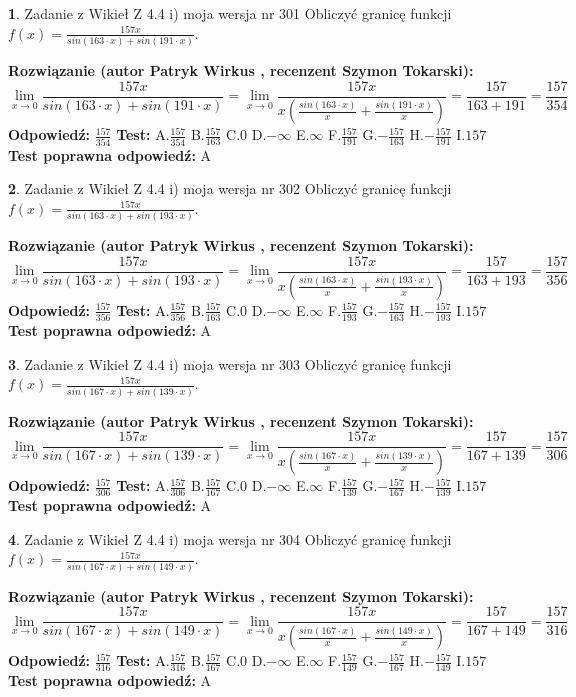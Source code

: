 \documentclass[12pt, a4paper]{article}
\theoremstyle{definition} %
\newtheorem{zad}{}
\newcommand{\zadStart}[1]{\begin{zad}#1\newline}
\newcommand{\zadStop}{\end{zad}}
\newcommand{\rozwStart}[2]{\noindent \textbf{Rozwiązanie (autor #1 , recenzent #2): }\newline}
\newcommand{\rozwStop}{\newline}
\newcommand{\odpStart}{\noindent \textbf{Odpowiedź:}\newline}
\newcommand{\odpStop}{\newline}
\newcommand{\testStart}{\noindent \textbf{Test:}\newline}
\newcommand{\testStop}{\newline}
\newcommand{\kluczStart}{\noindent \textbf{Test poprawna odpowiedź:}\newline}
\newcommand{\kluczStop}{\newline}
\begin{document}
\zadStart{Zadanie z Wikieł Z 4.4 i) moja wersja nr 301}
Obliczyć granicę funkcji $f(x)=\frac{157x}{sin(163\cdot x) +sin(191\cdot x)}$.
\zadStop
\rozwStart{Patryk Wirkus}{Szymon Tokarski}
$$\lim\limits_{x\to 0}\frac{157x}{sin(163\cdot x) +sin(191\cdot x)}=\lim\limits_{x\to 0}\frac{157x}{x(\frac{sin(163\cdot x)}{x}+\frac{sin(191\cdot x)}{x})}=\frac{157}{163+191} = \frac{157}{354}$$
\rozwStop
\odpStart
$\frac{157}{354}$
\odpStop
\testStart
A.$\frac{157}{354}$
B.$\frac{157}{163}$
C.$0$
D.$-\infty$
E.$\infty$
F.$\frac{157}{191}$
G.$-\frac{157}{163}$
H.$-\frac{157}{191}$
I.$157$
\testStop
\kluczStart
A
\kluczStop



\zadStart{Zadanie z Wikieł Z 4.4 i) moja wersja nr 302}
Obliczyć granicę funkcji $f(x)=\frac{157x}{sin(163\cdot x) +sin(193\cdot x)}$.
\zadStop
\rozwStart{Patryk Wirkus}{Szymon Tokarski}
$$\lim\limits_{x\to 0}\frac{157x}{sin(163\cdot x) +sin(193\cdot x)}=\lim\limits_{x\to 0}\frac{157x}{x(\frac{sin(163\cdot x)}{x}+\frac{sin(193\cdot x)}{x})}=\frac{157}{163+193} = \frac{157}{356}$$
\rozwStop
\odpStart
$\frac{157}{356}$
\odpStop
\testStart
A.$\frac{157}{356}$
B.$\frac{157}{163}$
C.$0$
D.$-\infty$
E.$\infty$
F.$\frac{157}{193}$
G.$-\frac{157}{163}$
H.$-\frac{157}{193}$
I.$157$
\testStop
\kluczStart
A
\kluczStop



\zadStart{Zadanie z Wikieł Z 4.4 i) moja wersja nr 303}
Obliczyć granicę funkcji $f(x)=\frac{157x}{sin(167\cdot x) +sin(139\cdot x)}$.
\zadStop
\rozwStart{Patryk Wirkus}{Szymon Tokarski}
$$\lim\limits_{x\to 0}\frac{157x}{sin(167\cdot x) +sin(139\cdot x)}=\lim\limits_{x\to 0}\frac{157x}{x(\frac{sin(167\cdot x)}{x}+\frac{sin(139\cdot x)}{x})}=\frac{157}{167+139} = \frac{157}{306}$$
\rozwStop
\odpStart
$\frac{157}{306}$
\odpStop
\testStart
A.$\frac{157}{306}$
B.$\frac{157}{167}$
C.$0$
D.$-\infty$
E.$\infty$
F.$\frac{157}{139}$
G.$-\frac{157}{167}$
H.$-\frac{157}{139}$
I.$157$
\testStop
\kluczStart
A
\kluczStop



\zadStart{Zadanie z Wikieł Z 4.4 i) moja wersja nr 304}
Obliczyć granicę funkcji $f(x)=\frac{157x}{sin(167\cdot x) +sin(149\cdot x)}$.
\zadStop
\rozwStart{Patryk Wirkus}{Szymon Tokarski}
$$\lim\limits_{x\to 0}\frac{157x}{sin(167\cdot x) +sin(149\cdot x)}=\lim\limits_{x\to 0}\frac{157x}{x(\frac{sin(167\cdot x)}{x}+\frac{sin(149\cdot x)}{x})}=\frac{157}{167+149} = \frac{157}{316}$$
\rozwStop
\odpStart
$\frac{157}{316}$
\odpStop
\testStart
A.$\frac{157}{316}$
B.$\frac{157}{167}$
C.$0$
D.$-\infty$
E.$\infty$
F.$\frac{157}{149}$
G.$-\frac{157}{167}$
H.$-\frac{157}{149}$
I.$157$
\testStop
\kluczStart
A
\kluczStop
\end{document}

